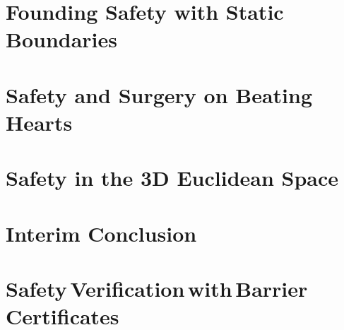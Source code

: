\chapter{Founding Safety with Static Boundaries}\label{chap:cbf_1d_static}


\chapter{Safety and Surgery on Beating Hearts} \label{chap:cbf_1d_dynamic}

\chapter{Safety in the 3D Euclidean Space}\label{chap:cbf_3d_static}

%
\chapter{Interim Conclusion}\label{chap:interim}


\chapter[Safety Verification with Barrier Certificates]{Safety\,Verification\,with\,Barrier\,Certificates}\label{chap:putinar}
	
